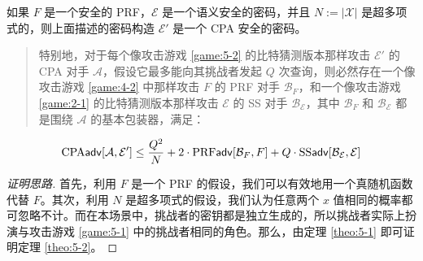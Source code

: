\begin{theorem}\label{theo:5-2}
如果 $F$ 是一个安全的 PRF，$\mathcal{E}$ 是一个语义安全的密码，并且 $N:=|\mathcal{X}|$ 是超多项式的，则上面描述的密码构造 $\mathcal{E}'$ 是一个 CPA 安全的密码。
\begin{quote}
特别地，对于每个像攻击游戏 \ref{game:5-2} 的比特猜测版本那样攻击 $\mathcal{E}'$ 的 CPA 对手 $\mathcal{A}$，假设它最多能向其挑战者发起 $Q$ 次查询，则必然存在一个像攻击游戏 \ref{game:4-2} 中那样攻击 $F$ 的 PRF 对手 $\mathcal{B}_F$，和一个像攻击游戏 \ref{game:2-1} 的比特猜测版本那样攻击 $\mathcal{E}$ 的 SS 对手 $\mathcal{B}_\mathcal{E}$，其中 $\mathcal{B}_F$ 和 $\mathcal{B}_\mathcal{E}$ 都是围绕 $\mathcal{A}$ 的基本包装器，满足：
\end{quote}
\begin{equation}\label{eq:5-5}
{\rm CPA}\mathsf{adv}[\mathcal{A},\mathcal{E}']\leq
\frac{Q^2}{N}+2\cdot{\rm PRF}\mathsf{adv}[\mathcal{B}_F,F]+Q\cdot{\rm SS}\mathsf{adv}[\mathcal{B}_\mathcal{E},\mathcal{E}]
\end{equation}
\end{theorem}

\begin{proof}[证明思路]
首先，利用 $F$ 是一个 PRF 的假设，我们可以有效地用一个真随机函数代替 $F$。其次，利用 $N$ 是超多项式的假设，我们认为任意两个 $x$ 值相同的概率都可忽略不计。而在本场景中，挑战者的密钥都是独立生成的，所以挑战者实际上扮演与攻击游戏 \ref{game:5-1} 中的挑战者相同的角色。那么，由定理 \ref{theo:5-1} 即可证明定理 \ref{theo:5-2}。
\end{proof}

